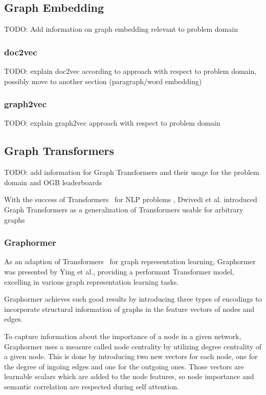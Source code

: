 \subsection{Graph Embedding}
TODO: Add information on graph embedding relevant to problem domain

\subsubsection{doc2vec}
TODO: explain doc2vec according to \cite{2014doc2vec} approach with respect to problem domain, possibly move to another section (paragraph/word embedding)

\subsubsection{graph2vec}
TODO: explain graph2vec \cite{2017graph2vec} approach with respect to problem domain

\subsection{Graph Transformers}
TODO: add information for Graph Transformers \cite{2020graphTransformers} \cite{li2019graphTransformer} \cite{cai2019graphTransformerSequence} \cite{dwivedi2021generalizationTransformer} and their usage for the problem domain and OGB leaderboards 

With the success of Transformers~\cite{vaswani2017attention} for NLP problems , Dwivedi et al. introduced Graph Transformers as a generalization of Transformers usable for arbitrary graphs~\cite{dwivedi2021generalizationTransformer} 

\subsubsection{Graphormer}
As an adaption of Transformers~\cite{vaswani2017attention} for graph representation learning, Graphormer~\cite{2021graphormer} was presented by Ying et al., providing a performant Transformer model, excelling in various graph representation learning tasks.

Graphormer achieves such good results by introducing three types of encodings to incorporate structural information of graphs in the feature vectors of nodes and edges. 

To capture information about the importance of a node in a given network, Graphormer uses a measure called node centrality by utilizing degree centrality of a given node. This is done by introducing two new vectors for each node, one for the degree of ingoing edges and one for the outgoing ones. Those vectors are learnable scalars which are added to the node features, so node importance and semantic correlation are respected during self attention. 

